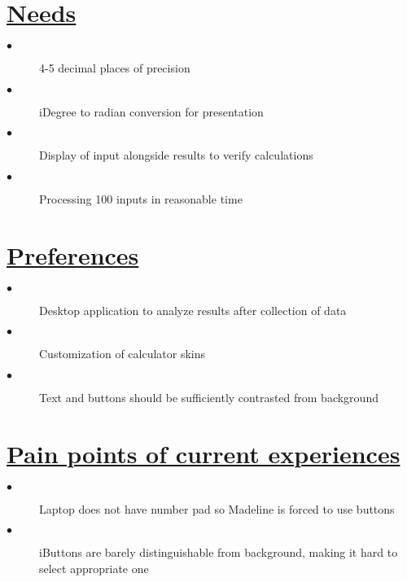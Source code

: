 \documentclass{article}
\begin{document}



\section*{\textbf{\underline{Needs}}}

\begin{description}
  \item[$\bullet$] 4-5 decimal places of precision
  \item[$\bullet$] iDegree to radian conversion for presentation
  \item[$\bullet$] Display of input alongside results to verify calculations
  \item[$\bullet$] Processing 100 inputs in reasonable time
\end{description}

\section*{\textbf{\underline{Preferences}}}
\begin{description}
  \item[$\bullet$] Desktop application to analyze results after collection of data
  \item[$\bullet$] Customization of calculator skins
  \item[$\bullet$] Text and buttons should be sufficiently contrasted from background
\end{description}

\section*{\textbf{\underline{Pain points of current experiences}}}
\begin{description}
  \item[$\bullet$] Laptop does not have number pad so Madeline is forced to use buttons
  \item[$\bullet$] iButtons are barely distinguishable from background, making it hard to select appropriate one
\end{description}



\end{document}
